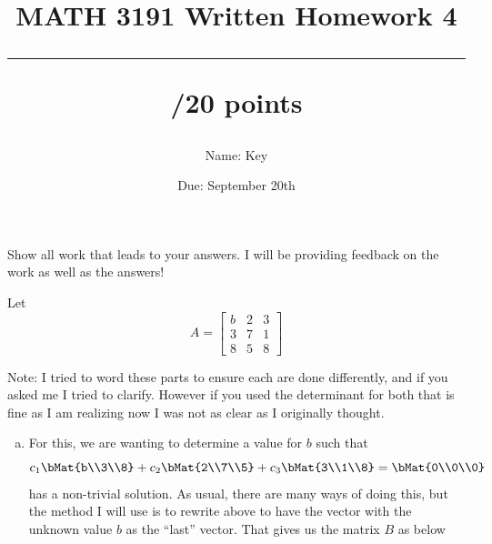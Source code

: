\documentclass[answers]{exam}
\title{MATH 3191 Written Homework 4\\\rule{30pt}{1pt}/20 points}
\author{Name: Key}
\date{Due: September 20th}
\begin{document}
\maketitle
Show all work that leads to your answers. I will be providing feedback on the work as well as the answers!
\begin{questions}
    \question[20] Let
    \[
        A = \begin{bmatrix}
            b & 2 & 3 \\
            3 & 7 & 1 \\
            8 & 5 & 8
        \end{bmatrix}
    \]

    \begin{solution}
        Note: I tried to word these parts to ensure each are done differently, and if you asked me
        I tried to clarify. However if you used the determinant for both that is fine as I am realizing
        now I was not as clear as I originally thought.
        \begin{enumerate}[(a)]
            \item For this, we are wanting to determine a value for $b$ such that
                \[
                    c_1\bMat{b\\3\\8} + c_2\bMat{2\\7\\5} + c_3\bMat{3\\1\\8} = \bMat{0\\0\\0}
                \]
                has a non-trivial solution. As usual, there are many ways of doing this, but the
                method I will use is to rewrite above to have the vector with the unknown value
                $b$ as the ``last'' vector. That gives us the matrix $B$ as below


\end{enumerate}
\end{solution}
\end{questions}
\end{document}
